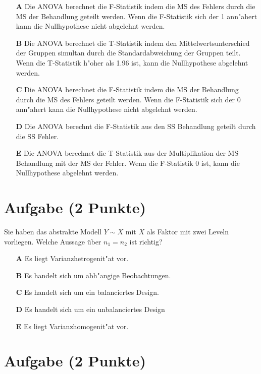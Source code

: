 \documentclass[a4paper, 10pt]{scrartcl}\usepackage[]{graphicx}\usepackage[]{xcolor}
\begin{document}
\begin{enumerate}
\item [\textbf{A} \msquare] Die ANOVA berechnet die F-Statistik indem die MS des Fehlers durch die MS der Behandlung geteilt werden. Wenn die F-Statistik sich der 1 ann{"a}hert kann die Nullhypothese nicht abgelehnt werden.
\item [\textbf{B} \msquare] Die ANOVA berechnet die T-Statistik indem den Mittelwertsunterschied der Gruppen simultan durch die Standardabweichung der Gruppen teilt. Wenn die T-Statistik h{"o}her als 1.96 ist, kann die Nullhypothese abgelehnt werden.
\item [\textbf{C} \msquare] Die ANOVA berechnet die F-Statistik indem die MS der Behandlung durch die MS des Fehlers geteilt werden. Wenn die F-Statistik sich der 0 ann{"a}hert kann die Nullhypothese nicht abgelehnt werden.
\item [\textbf{D} \msquare] Die ANOVA berechnt die F-Statistik aus den SS Behandlung geteilt durch die SS Fehler.
\item [\textbf{E} \msquare] Die ANOVA berechnet die T-Statistik aus der Multiplikation der MS Behandlung mit der MS der Fehler. Wenn die F-Statistik 0 ist, kann die Nullhypothese abgelehnt werden.
\end{enumerate} 

\section{Aufgabe \hfill (2 Punkte)}




Sie haben das abstrakte Modell $Y \sim X$ mit $X$ als Faktor mit zwei
Leveln vorliegen. Welche Aussage {\"u}ber $n_1 = n_2$ ist richtig?



\begin{enumerate}
\item [\textbf{A} \msquare] Es liegt Varianzhetrogenit{"a}t vor.
\item [\textbf{B} \msquare] Es handelt sich um abh{"a}ngige Beobachtungen.
\item [\textbf{C} \msquare] Es handelt sich um ein balanciertes Design.
\item [\textbf{D} \msquare] Es handelt sich um ein unbalanciertes Design
\item [\textbf{E} \msquare] Es liegt Varianzhomogenit{"a}t vor.
\end{enumerate} 

\section{Aufgabe \hfill (2 Punkte)}
\end{document}
